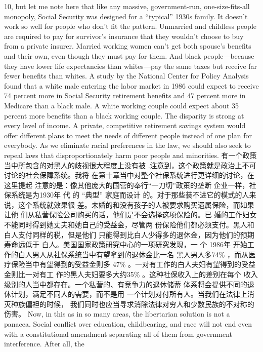 \begin{paracol}{2}
10, but let me note here that like any massive, government-run, one-size-fits-all monopoly, Social Security was designed for
a ``typical'' 1930s family. It doesn't work so well for people who
don't fit the pattern. Unmarried and childless people are required to pay for survivor's insurance that they wouldn't choose
to buy from a private insurer. Married working women can't
get both spouse's benefits and their own, even though they
must pay for them. And black people---because they have
lower life expectancies than whites---pay the same taxes but receive far fewer benefits than whites. A study by the National
Center for Policy Analysis found that a white male entering the
labor market in 1986 could expect to receive 74 percent more
in Social Security retirement benefits and 47 percent more in
Medicare than a black male. A white working couple could expect about 35 percent more benefits than a black working couple. The disparity is strong at every level of income. A private,
competitive retirement savings system would offer different
plans to meet the needs of different people instead of one plan
for everybody. As we eliminate racial preferences in the law, we
should also seek to repeal laws that disproportionately harm
poor people and minorities.
\switchcolumn
有一个政策当中所包含的对黑人的歧视很大程度上没有被
.注意到，这个政策就是政治上不可讨论的社会保障系统。我将
在第十章当中对整个社保系统进行更详细的讨论，在这里提起
注意的是：像其他庞大的国营的奉行“一刀切”政策的垄断
企业一样，社保系统是为1930年 代 的 “典型” 家庭而设计
的。对于那些装不进它的模式的人来说，这个系统就效果很
差。未婚的和没有孩子的人被要求购买遗属保险，而如果让他
们从私营保险公司购买的话，他们是不会选择这项保险的。已
婚的工作妇女不能同时得到她丈夫和她自己的受益金，尽管两
份保险他们都必须支付。黑人和白人支付同样的税，但是他们
只能得到比白人少得多的退休金，因为他们的预期寿命远低于
白人。美国国家政策研究中心的一项研究发现，一 个 1986年
开始工作的白人男人从社保系统当中有望拿到的退休金比一名
黑人男人多74\% ，而从医疗保险当中有望得到的受益金则多
47\% 。一对有工作的白人夫妇有望得到的受益金则比一对有工
作的黑人夫妇要多大约35\% 。这种社保收入上的差别在每个
收入级别的人当中都存在。一个私营的、有竞争力的退休储蓄
体系将会提供不同的退休计划，满足不同人的需要，而不是用
一个计划对付所有人。当我们在法律上消灭种族偏袒的时候，
我们同时也应当寻求消除法律对穷人和少数民族的不对称的
伤害。
\switchcolumn*
Now, in this as in so many areas, the libertarian solution is
not a panacea. Social conflict over education, childbearing, and race will not end even with a constitutional amendment separating all of them from government interference. After all, the

\end{paracol}
